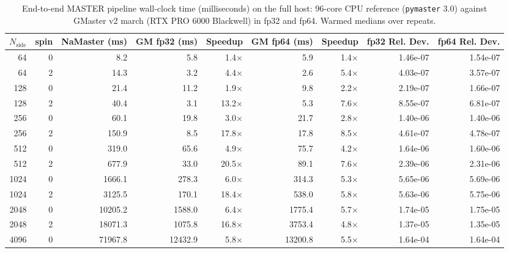 
\begin{table}
\centering
\caption{End-to-end MASTER pipeline wall-clock time (milliseconds) on the full host: 96-core CPU reference (\texttt{pymaster} 3.0) against GMaster v2 march (RTX PRO 6000 Blackwell) in fp32 and fp64. Warmed medians over repeats.}
\label{tab:e2e_v2}
\small
\begin{tabular}{@{}rrrrrrrrr@{}}
\toprule
$N_{\mathrm{side}}$ & spin & NaMaster (ms) & GM fp32 (ms) & Speedup & GM fp64 (ms) & Speedup & fp32 Rel. Dev. & fp64 Rel. Dev. \\
\midrule
64 & 0 & 8.2 & 5.8 & 1.4$\times$ & 5.9 & 1.4$\times$ & 1.46e-07 & 1.54e-07 \\
64 & 2 & 14.3 & 3.2 & 4.4$\times$ & 2.6 & 5.4$\times$ & 4.03e-07 & 3.57e-07 \\
128 & 0 & 21.4 & 11.2 & 1.9$\times$ & 9.8 & 2.2$\times$ & 2.19e-07 & 1.66e-07 \\
128 & 2 & 40.4 & 3.1 & 13.2$\times$ & 5.3 & 7.6$\times$ & 8.55e-07 & 6.81e-07 \\
256 & 0 & 60.1 & 19.8 & 3.0$\times$ & 21.7 & 2.8$\times$ & 1.40e-06 & 1.40e-06 \\
256 & 2 & 150.9 & 8.5 & 17.8$\times$ & 17.8 & 8.5$\times$ & 4.61e-07 & 4.78e-07 \\
512 & 0 & 319.0 & 65.6 & 4.9$\times$ & 75.7 & 4.2$\times$ & 1.64e-06 & 1.60e-06 \\
512 & 2 & 677.9 & 33.0 & 20.5$\times$ & 89.1 & 7.6$\times$ & 2.39e-06 & 2.31e-06 \\
1024 & 0 & 1666.1 & 278.3 & 6.0$\times$ & 314.3 & 5.3$\times$ & 5.65e-06 & 5.69e-06 \\
1024 & 2 & 3125.5 & 170.1 & 18.4$\times$ & 538.0 & 5.8$\times$ & 5.63e-06 & 5.75e-06 \\
2048 & 0 & 10205.2 & 1588.0 & 6.4$\times$ & 1775.4 & 5.7$\times$ & 1.74e-05 & 1.75e-05 \\
2048 & 2 & 18071.3 & 1075.8 & 16.8$\times$ & 3753.4 & 4.8$\times$ & 1.37e-05 & 1.35e-05 \\
4096 & 0 & 71967.8 & 12432.9 & 5.8$\times$ & 13200.8 & 5.5$\times$ & 1.64e-04 & 1.64e-04 \\
\bottomrule
\end{tabular}
\end{table}

